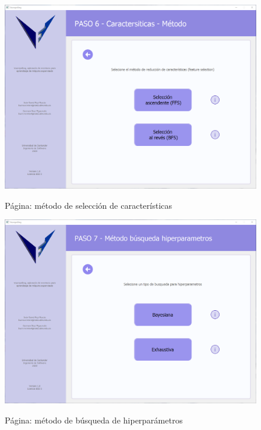 \begin{figure}[H]
    \centering
    \caption{Página: método de selección de características}
    \includegraphics[width=\textwidth]{images/featureselectionmethod.png}
    \label{fig:featureselectionmethod}
\end{figure}

\begin{figure}[H]
    \centering
    \caption{Página: método de búsqueda de hiperparámetros}
    \includegraphics[width=\textwidth]{images/hiperparametersearchmethod.png}
    \label{fig:hiperparamsearchmethod}
\end{figure}